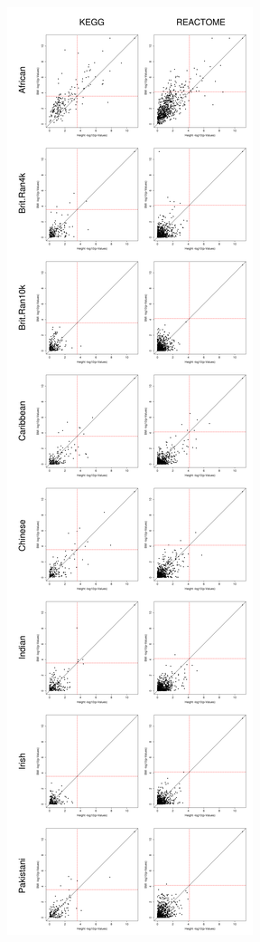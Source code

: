 \documentclass[12pt, a4paper]{article}
\begin{document}
\begin{figure}[htbp]
\centering
\includegraphics[scale=.15]{Images/Supp/InterPath_Supp_PhenoCompDotPlots_vs1.png}

\end{figure}
\end{document}
